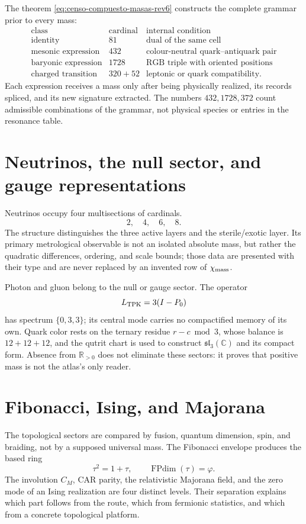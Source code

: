 The theorem \eqref{eq:censo-compuesto-masas-rev6} constructs the complete grammar
prior to every mass:
\[
\begin{array}{c|r|l}
\text{class}&\text{cardinal}&\text{internal condition}\\ \hline
\text{identity}&81&\text{dual of the same cell}\\
\text{mesonic expression}&432&\text{colour-neutral quark--antiquark pair}\\
\text{baryonic expression}&1728&\text{RGB triple with oriented positions}\\
\text{charged transition}&320+52&
\text{leptonic or quark compatibility}.
\end{array}
\tag{C7}\label{eq:clases-compuestas-catalogo-rev6}
\]
Each expression receives a mass only after being physically realized,
its records spliced, and its new signature extracted. The numbers
\(432,1728,372\) count admissible combinations of the grammar, not
physical species or entries in the resonance table.

\section{Neutrinos, the null sector, and gauge representations}

Neutrinos occupy four multisections of cardinals.
\[
2,\quad4,\quad6,\quad8.
\]
The structure distinguishes the three active layers and the
sterile/exotic layer. Its primary metrological observable is not an isolated
absolute mass, but rather the quadratic differences, ordering, and scale
bounds; those data are presented with their type and are never replaced by an
invented row of \(\chi_{\rm mass}\).

Photon and gluon belong to the null or gauge sector. The operator
\[
L_{\rm TPK}=3(I-P_0)
\]
has spectrum \(\{0,3,3\}\); its central mode carries no compactified memory of its own. Quark color rests on the ternary residue \(r-c\bmod3\), whose balance is \(12+12+12\), and the qutrit chart is used to construct \(\mathfrak{sl}_3(\mathbb C)\) and its compact form. Absence from \(\mathbb R_{>0}\) does not eliminate these sectors: it proves that positive mass is not the atlas's only reader.

\section{Fibonacci, Ising, and Majorana}

The topological sectors are compared by fusion, quantum dimension, spin, and
braiding, not by a supposed universal mass. The Fibonacci envelope produces
the based ring
\[
\tau^2=1+\tau,
\qquad
\operatorname{FPdim}(\tau)=\varphi.
\tag{C8}\label{eq:fibonacci-catalogo-rev6}
\]
The involution \(C_M\), CAR parity, the relativistic Majorana field, and the
zero mode of an Ising realization are four distinct levels. Their
separation explains which part follows from the route, which from fermionic
statistics, and which from a concrete topological platform.


